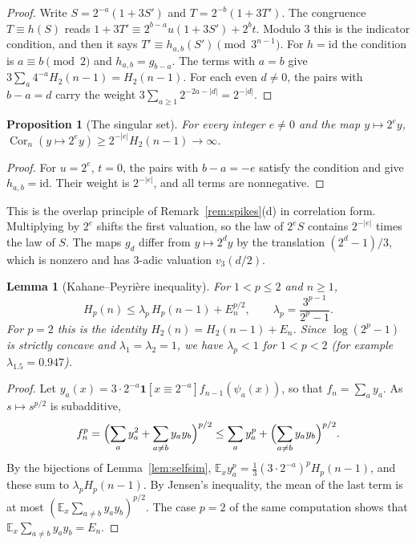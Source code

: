 \documentclass[12pt]{amsart}
\newtheorem{lemma}{Lemma}
\newtheorem{proposition}{Proposition}
\theoremstyle{definition}
\theoremstyle{remark}
\begin{document}
\begin{proof}
Write $S=2^{-a}(1+3S')$ and $T=2^{-b}(1+3T')$. The congruence $T\equiv h(S)$ reads $1+3T'\equiv2^{b-a}u(1+3S')+2^bt$. Modulo $3$ this is the indicator condition, and then it says $T'\equiv h_{a,b}(S')\pmod{3^{n-1}}$. For $h=\mathrm{id}$ the condition is $a\equiv b\pmod2$ and $h_{a,b}=g_{b-a}$. The terms with $a=b$ give $3\sum_a4^{-a}H_2(n-1)=H_2(n-1)$. For each even $d\ne0$, the pairs with $b-a=d$ carry the weight $3\sum_{a\ge1}2^{-2a-|d|}=2^{-|d|}$.
\end{proof}

\begin{proposition}[The singular set]
\label{prop:singular}
For every integer $e\ne0$ and the map $y\mapsto2^ey$, $\operatorname{Cor}_n(y\mapsto2^ey)\ge2^{-|e|}H_2(n-1)\to\infty$.
\end{proposition}

\begin{proof}
For $u=2^e$, $t=0$, the pairs with $b-a=-e$ satisfy the condition and give $h_{a,b}=\mathrm{id}$. Their weight is $2^{-|e|}$, and all terms are nonnegative.
\end{proof}

This is the overlap principle of Remark~\ref{rem:spikes}(d) in correlation form. Multiplying by $2^e$ shifts the first valuation, so the law of $2^eS$ contains $2^{-|e|}$ times the law of $S$. The maps $g_d$ differ from $y\mapsto2^dy$ by the translation $(2^d-1)/3$, which is nonzero and has $3$-adic valuation $v_3(d/2)$.

\begin{lemma}[Kahane--Peyri\`ere inequality]
\label{lem:kp}
For $1<p\le2$ and $n\ge1$,
\[
 H_p(n)\le\lambda_p\,H_p(n-1)+E_n^{p/2},\qquad\lambda_p=\frac{3^{p-1}}{2^p-1}.
\]
For $p=2$ this is the identity $H_2(n)=H_2(n-1)+E_n$. Since $\log(2^p-1)$ is strictly concave and $\lambda_1=\lambda_2=1$, we have $\lambda_p<1$ for $1<p<2$ (for example $\lambda_{1.5}=0.947$).
\end{lemma}

\begin{proof}
Let $y_a(x)=3\cdot2^{-a}\mathbf 1[x\equiv2^{-a}]f_{n-1}(\psi_a(x))$, so that $f_n=\sum_ay_a$. As $s\mapsto s^{p/2}$ is subadditive,
\[
 f_n^p=\Bigl(\sum_ay_a^2+\sum_{a\ne b}y_ay_b\Bigr)^{p/2}\le\sum_ay_a^p+\Bigl(\sum_{a\ne b}y_ay_b\Bigr)^{p/2}.
\]
By the bijections of Lemma~\ref{lem:selfsim}, $\mathbb E_xy_a^p=\frac13(3\cdot2^{-a})^pH_p(n-1)$, and these sum to $\lambda_pH_p(n-1)$. By Jensen's inequality, the mean of the last term is at most $(\mathbb E_x\sum_{a\ne b}y_ay_b)^{p/2}$. The case $p=2$ of the same computation shows that $\mathbb E_x\sum_{a\ne b}y_ay_b=E_n$.
\end{proof}
\end{document}

